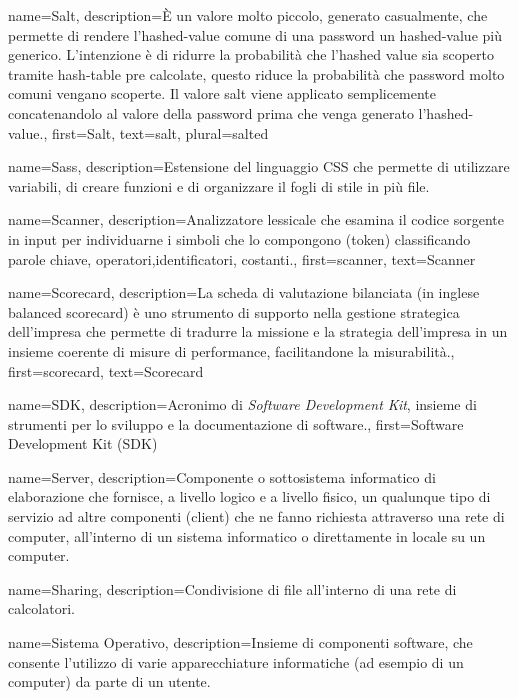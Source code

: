 {
name={Salt},
description={\`E un valore molto piccolo, generato casualmente, che permette di rendere l'hashed-value comune di una password un hashed-value più generico. L'intenzione è di ridurre la probabilità che l'hashed value sia scoperto tramite hash-table pre calcolate, questo riduce la probabilità che password molto comuni vengano scoperte. Il valore salt viene applicato semplicemente concatenandolo al valore della password prima che venga generato l'hashed-value.},
first={Salt},
text={salt},
plural={salted}
}

{
name={Sass},
description={Estensione del linguaggio CSS che permette di utilizzare variabili, di creare funzioni e di organizzare il fogli di stile in più file.}
}

{
name={Scanner},
description={Analizzatore lessicale che esamina il codice sorgente in input per individuarne i simboli che lo compongono (token) classificando parole chiave, operatori,identificatori, costanti.},
first={scanner},
text={Scanner}
}

{
name={Scorecard},
description={La scheda di valutazione bilanciata (in inglese balanced scorecard) è uno strumento di supporto nella gestione strategica dell'impresa che permette di tradurre la missione e la strategia dell'impresa in un insieme coerente di misure di performance, facilitandone la misurabilità.},
first={scorecard},
text={Scorecard}
}

{
name={SDK},
description={Acronimo di \textit{Software Development Kit}, insieme di strumenti per lo sviluppo e la documentazione di software.},
first={Software Development Kit (SDK)}
}

{
name={Server},
description={Componente o sottosistema informatico di elaborazione che fornisce, a livello logico e a livello fisico, un qualunque tipo di servizio ad altre componenti (client) che ne fanno richiesta attraverso una rete di computer, all'interno di un sistema informatico o direttamente in locale su un computer.}
}

{
name={Sharing},
description={Condivisione di file all'interno di una rete di calcolatori.}
}

{
name={Sistema Operativo},
description={Insieme di componenti software, che consente l'utilizzo di varie apparecchiature informatiche (ad esempio di un computer) da parte di un utente.}
}

